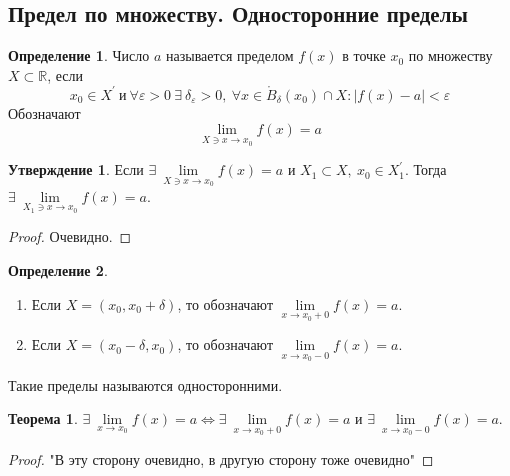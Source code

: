 \documentclass[a4paper, 12pt]{article}
\newcommand{\R}{\mathbb{R}}
\newcommand{\Bo}{\mathring{B}}
\renewcommand{\epsilon}{\varepsilon}
\newcommand\tab[1][.5cm]{\hspace*{#1}}
\theoremstyle{definition}
\newtheorem*{definition}{Определение}
\newtheorem*{theorem}{Теорема}
\newtheorem*{statement}{Утверждение}
\begin{document}
    \subsection{Предел по множеству. Односторонние пределы}
        \begin{definition}
            Число $a$ называется пределом $f(x)$ в точке $x_0$ по множеству $X\subset \R$, если 
            \[x_0\in X^{\prime}\ \text{и}\ \forall\epsilon>0\ \exists\ \delta_{\epsilon}>0,\ \forall x\in \Bo_{\delta}(x_0)\cap X: |f(x)-a|<\epsilon\]
            Обозначают \[\lim\limits_{X\ni x\to x_0}f(x)=a\]
        \end{definition} 
        \begin{statement}
            Если $\exists\ \lim\limits_{X\ni x\to x_0}f(x)=a$ и $X_1\subset X,\ x_0\in X_1^{\prime}$. Тогда\\
            $\exists\ \lim\limits_{X_1\ni x\to x_0}f(x)=a$.
        \end{statement} 
        \begin{proof}
            Очевидно.
        \end{proof}
        \begin{definition}\tab\
            \begin{enumerate}
                \item Если $X=(x_0,x_0+\delta)$, то обозначают $\lim\limits_{x\to x_0+0}f(x)=a$.
                \item Если $X=(x_0-\delta, x_0)$, то обозначают $\lim\limits_{x\to x_0-0}f(x)=a$.
            \end{enumerate}
            Такие пределы называются односторонними.
        \end{definition} 
        \begin{theorem}
            $\exists\ \lim\limits_{x\to x_0}f(x)=a \Leftrightarrow \exists\ \lim\limits_{x\to x_0+0}f(x)=a$ и $\exists\ \lim\limits_{x\to x_0-0}f(x)=a$.
        \end{theorem} 
        \begin{proof}
            "В эту сторону очевидно, в другую сторону тоже очевидно"
        \end{proof} 
\end{document}
